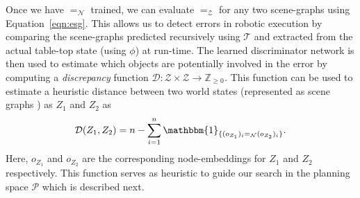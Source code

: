 Once we have $=_\mathcal{N}$ trained, we can evaluate $=_\mathcal{Z}$ for any two scene-graphs using Equation~\ref{eqn:esg}. This allows us to detect errors in robotic execution by comparing the scene-graphs predicted recursively using $\mathcal{T}$ and extracted from the actual table-top state (using $\phi$) at run-time. 
%
The learned discriminator network is then used to estimate which objects are potentially involved in the error by computing a  \emph{discrepancy} function $\mathcal{D}: \mathcal{Z} \times \mathcal{Z} \rightarrow \mathbb{Z}_{\geq 0}$\textit{.} 
%
This function can be used to estimate a heuristic distance between two world states (represented as scene graphs ) as $Z_1$ and $Z_2$ as   
%
\begin{equation}
    \mathcal{D}(Z_1, Z_2) =  n - \sum_{i = 1}^{n} \mathbbm{1}_{\{(o_{Z_1})_i =_\mathcal{N} (o_{Z_2})_i\}}.
\end{equation}
%
Here, $o_{Z_1}$ and $o_{Z_2}$ are the corresponding node-embeddings for $Z_1$ and $Z_2$ respectively. 
%
This function serves as heuristic to guide our search in the planning space $\mathcal{P}$ which is described next. 

